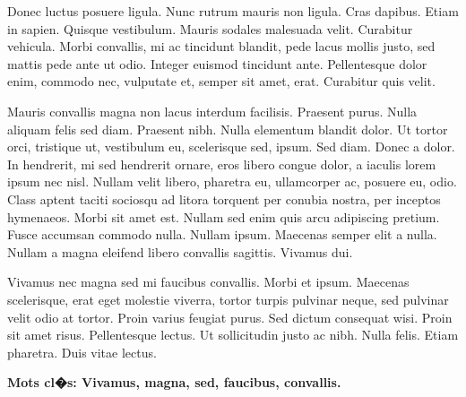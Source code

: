 \resume
{}



\noindent Donec luctus posuere ligula. Nunc rutrum mauris non
ligula. Cras dapibus. Etiam in sapien. Quisque vestibulum. Mauris
sodales malesuada velit. Curabitur vehicula. Morbi convallis, mi
ac tincidunt blandit, pede lacus mollis justo, sed mattis pede
ante ut odio. Integer euismod tincidunt ante. Pellentesque dolor
enim, commodo nec, vulputate et, semper sit amet, erat. Curabitur
quis velit.

Mauris convallis magna non lacus interdum facilisis. Praesent
purus. Nulla aliquam felis sed diam. Praesent nibh. Nulla
elementum blandit dolor. Ut tortor orci, tristique ut, vestibulum
eu, scelerisque sed, ipsum. Sed diam. Donec a dolor. In hendrerit,
mi sed hendrerit ornare, eros libero congue dolor, a iaculis lorem
ipsum nec nisl. Nullam velit libero, pharetra eu, ullamcorper ac,
posuere eu, odio. Class aptent taciti sociosqu ad litora torquent
per conubia nostra, per inceptos hymenaeos. Morbi sit amet est.
Nullam sed enim quis arcu adipiscing pretium. Fusce accumsan
commodo nulla. Nullam ipsum. Maecenas semper elit a nulla. Nullam
a magna eleifend libero convallis sagittis. Vivamus dui.

Vivamus nec magna sed mi faucibus convallis. Morbi et ipsum.
Maecenas scelerisque, erat eget molestie viverra, tortor turpis
pulvinar neque, sed pulvinar velit odio at tortor. Proin varius
feugiat purus. Sed dictum consequat wisi. Proin sit amet risus.
Pellentesque lectus. Ut sollicitudin justo ac nibh. Nulla felis.
Etiam pharetra. Duis vitae lectus.



{\bfseries Mots cl�s\hspace{-3pt}: Vivamus,  magna, sed, faucibus,
convallis.}


